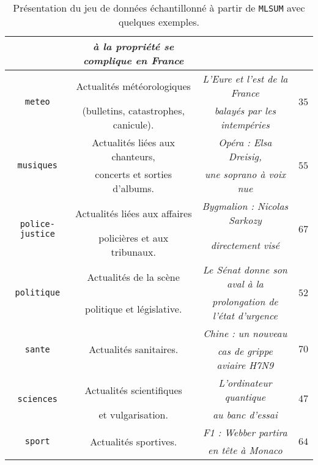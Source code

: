 \begin{table}[!htb]
\begin{center}
\begin{scriptsize}
\begin{tabular}{|c|c|c|c|}
					& \textit{à la propriété se complique en France}
					&
					\tabularnewline
					\hline
				\multirow{2}{*}{\texttt{meteo}}
					& Actualités météorologiques
					& \textit{L'Eure et l'est de la France}
					& \multirow{2}{*}{$35$}
					\tabularnewline
					& (bulletins, catastrophes, canicule).
					& \textit{balayés par les intempéries}
					&
					\tabularnewline
					\hline
				\multirow{2}{*}{\texttt{musiques}}
					& Actualités liées aux chanteurs,
					& \textit{Opéra : Elsa Dreisig,}
					& \multirow{2}{*}{$55$}
					\tabularnewline
					& concerts et sorties d'albums.
					& \textit{une soprano à voix nue}
					&
					\tabularnewline
					\hline
				\multirow{2}{*}{\texttt{police-justice}}
					&Actualités liées aux affaires
					& \textit{Bygmalion : Nicolas Sarkozy}
					& \multirow{2}{*}{$67$}
					\tabularnewline
					& policières et aux tribunaux.
					& \textit{directement visé}
					&
					\tabularnewline
					\hline
				\multirow{2}{*}{\texttt{politique}}
					& Actualités de la scène
					& \textit{Le Sénat donne son aval à la}
					& \multirow{2}{*}{$52$}
					\tabularnewline
					& politique et législative.
					& \textit{prolongation de l'état d'urgence}
					&
					\tabularnewline
					\hline
				\multirow{2}{*}{\texttt{sante}}
					& \multirow{2}{*}{Actualités sanitaires.}
					& \textit{Chine : un nouveau}
					& \multirow{2}{*}{$70$}
					\tabularnewline
					&
					& \textit{cas de grippe aviaire H7N9}
					&
					\tabularnewline
					\hline
				\multirow{2}{*}{\texttt{sciences}}
					& Actualités scientifiques
					& \textit{L'ordinateur quantique}
					& \multirow{2}{*}{$47$}
					\tabularnewline
					& et vulgarisation.
					& \textit{au banc d'essai}
					&
					\tabularnewline
					\hline
				\multirow{2}{*}{\texttt{sport}}
					& \multirow{2}{*}{Actualités sportives.}
					& \textit{F1 : Webber partira}
					& \multirow{2}{*}{$64$}
					\tabularnewline
					&
					& \textit{en tête à Monaco}
					&
					\tabularnewline
					\hline
			\end{tabular}
			\end{scriptsize}
			\end{center}
			\caption{
				Présentation du jeu de données échantillonné à partir de \texttt{MLSUM} avec quelques exemples.
			}
			\label{table:A.2-DATASET-MLSUM-SUBSET-SCHILD}
		\end{table}
		
